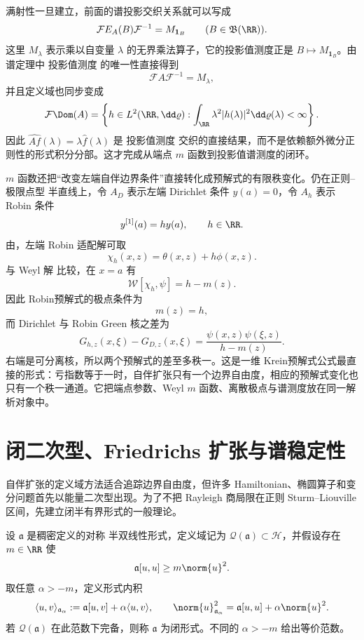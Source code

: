 满射性一旦建立，前面的谱投影交织关系就可以写成
\[
 \mathcal F E_A(B)\mathcal F^{-1}=M_{\mathbf1_B}
 \qquad(B\in\mathfrak B(\RR)).
\]
这里 $M_\lambda$ 表示乘以自变量 $\lambda$ 的无界乘法算子，它的投影值测度正是 $B\mapsto M_{\mathbf1_B}$。由谱定理中 投影值测度 的唯一性直接得到
\[
 \mathcal F A\mathcal F^{-1}=M_\lambda,
\]
并且定义域也同步变成
\[
 \mathcal F\Dom(A)
 =\left\{h\in L^2(\RR,\dd\varrho):
 \int_{\RR}\lambda^2|h(\lambda)|^2\dd\varrho(\lambda)<\infty\right\}.
\]
因此 $\widehat{Af}(\lambda)=\lambda\widehat f(\lambda)$ 是 投影值测度 交织的直接结果，而不是依赖额外微分正则性的形式积分分部。这才完成从端点 $m$ 函数到投影值谱测度的闭环。

$m$ 函数还把“改变左端自伴边界条件”直接转化成预解式的有限秩变化。仍在正则--极限点型 半直线上，令 $A_D$ 表示左端 Dirichlet 条件 $y(a)=0$，令 $A_h$ 表示 Robin 条件
\[
 y^{[1]}(a)=h y(a),
 \qquad h\in\RR.
\]
由，左端 Robin 适配解可取
\[
 \chi_h(x,z)=\theta(x,z)+h\phi(x,z).
\]
与 Weyl 解 比较，在 $x=a$ 有
\[
 \mathcal W[\chi_h,\psi]
 =h-m(z).
\]
因此 Robin预解式的极点条件为
\begin{equation*}m(z)=h,
\end{equation*}
而 Dirichlet 与 Robin Green 核之差为
\begin{equation*}G_{h,z}(x,\xi)-G_{D,z}(x,\xi)
 =\frac{\psi(x,z)\psi(\xi,z)}{h-m(z)}.
\end{equation*}
右端是可分离核，所以两个预解式的差至多秩一。这是一维 Krein预解式公式最直接的形式：亏指数等于一时，自伴扩张只有一个边界自由度，相应的预解式变化也只有一个秩一通道。它把端点参数、Weyl $m$ 函数、离散极点与谱测度放在同一解析对象中。



\section{闭二次型、Friedrichs 扩张与谱稳定性}

自伴扩张的定义域方法适合追踪边界自由度，但许多 Hamiltonian、椭圆算子和变分问题首先以能量二次型出现。为了不把 Rayleigh 商局限在正则 Sturm--Liouville 区间，先建立闭半有界形式的一般理论。

\begin{definition}[下半有界闭形式]
设 $\mathfrak a$ 是稠密定义的对称 半双线性形式，定义域记为 $\mathcal Q(\mathfrak a)\subset\mathcal H$，并假设存在 $m\in\RR$ 使
\[
 \mathfrak a[u,u]\ge m\norm{u}^2.
\]
取任意 $\alpha>-m$，定义形式内积
\begin{equation}\label{eq:math-sl-form-norm}
 \langle u,v\rangle_{\mathfrak a_\alpha}
 :=\mathfrak a[u,v]+\alpha\langle u,v\rangle,
 \qquad
 \norm{u}_{\mathfrak a_\alpha}^2
 =\mathfrak a[u,u]+\alpha\norm{u}^2.
\end{equation}
若 $\mathcal Q(\mathfrak a)$ 在此范数下完备，则称 $\mathfrak a$ 为闭形式。不同的 $\alpha>-m$ 给出等价范数。
\end{definition}

